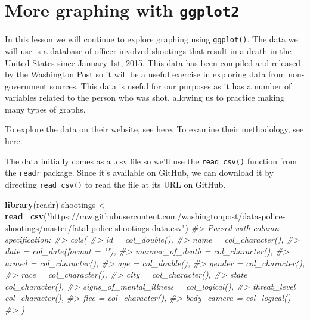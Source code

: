 \documentclass[
  12pt,
]{book}
\newenvironment{Shaded}{\begin{snugshade}}{\end{snugshade}}
\newcommand{\CommentTok}[1]{\textcolor[rgb]{0.37,0.37,0.37}{\textit{#1}}}
\newcommand{\KeywordTok}[1]{\textcolor[rgb]{0.27,0.27,0.27}{\textbf{#1}}}
\newcommand{\NormalTok}[1]{#1}
\newcommand{\StringTok}[1]{\textcolor[rgb]{0.5,0.5,0.5}{#1}}
\begin{document}
\hypertarget{ois_graphs}{%
\chapter{\texorpdfstring{More graphing with \texttt{ggplot2}}{More graphing with ggplot2}}\label{ois_graphs}}

In this lesson we will continue to explore graphing using \texttt{ggplot()}. The data we will use is a database of officer-involved shootings that result in a death in the United States since January 1st, 2015. This data has been compiled and released by the Washington Post so it will be a useful exercise in exploring data from non-government sources. This data is useful for our purposes as it has a number of variables related to the person who was shot, allowing us to practice making many types of graphs.

To explore the data on their website, see \href{https://www.washingtonpost.com/graphics/2019/national/police-shootings-2019/?utm_term=.e870afc9a00c}{here}.
To examine their methodology, see \href{https://www.washingtonpost.com/national/how-the-washington-post-is-examining-police-shootings-in-the-united-states/2016/07/07/d9c52238-43ad-11e6-8856-f26de2537a9d_story.html?utm_term=.f07e9800092b}{here}.

The data initially comes as a .csv file so we'll use the \texttt{read\_csv()} function from the \texttt{readr} package. Since it's available on GitHub, we can download it by directing \texttt{read\_csv()} to read the file at its URL on GitHub.

\begin{Shaded}
\begin{Highlighting}[]
\KeywordTok{library}\NormalTok{(readr)}
\NormalTok{shootings <{-}}\StringTok{ }\KeywordTok{read\_csv}\NormalTok{(}\StringTok{"https://raw.githubusercontent.com/washingtonpost/data{-}police{-}shootings/master/fatal{-}police{-}shootings{-}data.csv"}\NormalTok{)}
\CommentTok{\#> Parsed with column specification:}
\CommentTok{\#> cols(}
\CommentTok{\#>   id = col\_double(),}
\CommentTok{\#>   name = col\_character(),}
\CommentTok{\#>   date = col\_date(format = ""),}
\CommentTok{\#>   manner\_of\_death = col\_character(),}
\CommentTok{\#>   armed = col\_character(),}
\CommentTok{\#>   age = col\_double(),}
\CommentTok{\#>   gender = col\_character(),}
\CommentTok{\#>   race = col\_character(),}
\CommentTok{\#>   city = col\_character(),}
\CommentTok{\#>   state = col\_character(),}
\CommentTok{\#>   signs\_of\_mental\_illness = col\_logical(),}
\CommentTok{\#>   threat\_level = col\_character(),}
\CommentTok{\#>   flee = col\_character(),}
\CommentTok{\#>   body\_camera = col\_logical()}
\CommentTok{\#> )}
\end{Highlighting}
\end{Shaded}
\end{document}

